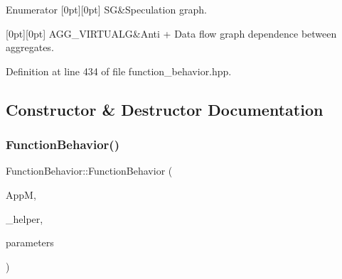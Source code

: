 \begin{DoxyEnumFields}{Enumerator}
[0pt][0pt]{}\mbox{\label{classFunctionBehavior_aed344711ee2798586d99f537b4b7975ca6f9176f9727d2bdb0a994fca93faf065}} 
SG&Speculation graph. \\
\hline

[0pt][0pt]{}\mbox{\label{classFunctionBehavior_aed344711ee2798586d99f537b4b7975ca877a4595bdce475075578f54c5ac6586}} 
A\+G\+G\+\_\+\+V\+I\+R\+T\+U\+A\+LG&Anti + Data flow graph dependence between aggregates. \\
\hline

\end{DoxyEnumFields}


Definition at line 434 of file function\+\_\+behavior.\+hpp.



\subsection{Constructor \& Destructor Documentation}
\mbox{\label{classFunctionBehavior_a1cf338a36811ebac226839fa375f9c34}} 
\subsubsection{\texorpdfstring{Function\+Behavior()}{FunctionBehavior()}}
{\footnotesize\ttfamily Function\+Behavior\+::\+Function\+Behavior (\begin{DoxyParamCaption}\item[{const \hyperlink{application__manager_8hpp_abb985163a2a3fb747f6f03b1eaadbb44}{application\+\_\+manager\+Const\+Ref}}]{AppM,  }\item[{const \hyperlink{behavioral__helper_8hpp_a9da8798985d185e76cbde965d9d68f84}{Behavioral\+Helper\+Ref}}]{\+\_\+helper,  }\item[{const \hyperlink{Parameter_8hpp_a37841774a6fcb479b597fdf8955eb4ea}{Parameter\+Const\+Ref}}]{parameters }\end{DoxyParamCaption})}



